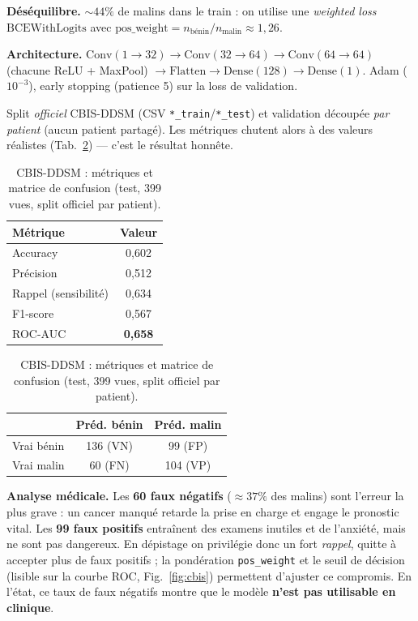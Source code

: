 \documentclass[11pt]{article}
\begin{document}
\textbf{Déséquilibre.} $\sim\!44\%$ de malins dans le train : on utilise une \emph{weighted loss}
$\mathrm{BCEWithLogits}$ avec $\mathrm{pos\_weight}=n_{\text{bénin}}/n_{\text{malin}}\approx 1{,}26$.

\textbf{Architecture.}
$\mathrm{Conv}(1\!\to\!32)\!\to\!\mathrm{Conv}(32\!\to\!64)\!\to\!\mathrm{Conv}(64\!\to\!64)$
(chacune ReLU + MaxPool) $\to\!\mathrm{Flatten}\!\to\!\mathrm{Dense}(128)\!\to\!\mathrm{Dense}(1)$.
Adam ($10^{-3}$), early stopping (patience 5) sur la loss de validation.

Split \emph{officiel} CBIS-DDSM (CSV \texttt{*\_train}/\texttt{*\_test})
et validation découpée \emph{par patient} (aucun patient partagé). Les métriques chutent alors à des
valeurs réalistes (Tab.~\ref{tab:cbis}) --- c'est le résultat honnête.

\begin{table}[H]
\centering\small
\begin{minipage}{0.46\textwidth}\centering
\begin{tabular}{lc}
\toprule
Métrique & Valeur \\
\midrule
Accuracy & 0,602 \\
Précision & 0,512 \\
Rappel (sensibilité) & 0,634 \\
F1-score & 0,567 \\
ROC-AUC & \textbf{0,658} \\
\bottomrule
\end{tabular}
\end{minipage}\hfill
\begin{minipage}{0.50\textwidth}\centering
\begin{tabular}{lcc}
\toprule
 & Préd. bénin & Préd. malin \\
\midrule
Vrai bénin & 136 (VN) & 99 (FP) \\
Vrai malin & 60 (FN) & 104 (VP) \\
\bottomrule
\end{tabular}
\end{minipage}
\caption{CBIS-DDSM : métriques et matrice de confusion (test, 399 vues, split officiel par patient).}
\label{tab:cbis}
\end{table}

\vspace{-0.25cm}
\textbf{Analyse médicale.} Les \textbf{60 faux négatifs} ($\approx 37\%$ des malins) sont l'erreur la
plus grave : un cancer manqué retarde la prise en charge et engage le pronostic vital. Les
\textbf{99 faux positifs} entraînent des examens inutiles et de l'anxiété, mais ne sont pas dangereux.
En dépistage on privilégie donc un fort \emph{rappel}, quitte à accepter plus de faux positifs ; la
pondération \texttt{pos\_weight} et le seuil de décision (lisible sur la courbe ROC,
Fig.~\ref{fig:cbis}) permettent d'ajuster ce compromis. En l'état, ce taux de faux négatifs montre que
le modèle \textbf{n'est pas utilisable en clinique}.
\end{document}
